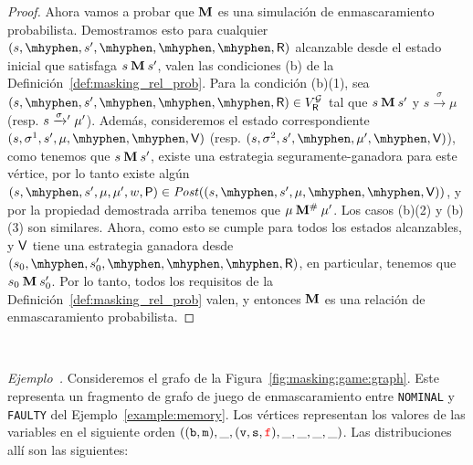 \begin{proof}
Ahora vamos a probar que $\mathbin{\mathbf{M}}$ es una simulación de enmascaramiento probabilista. Demostramos esto para cualquier $(s,\mhyphen,s',\mhyphen, \mhyphen,  \mhyphen, \Refuter)$ alcanzable desde el estado inicial que satisfaga $s \mathbin{\mathbf{M}} s'$, valen las condiciones (b) de la Definición~\ref{def:masking_rel_prob}.  Para la condición (b)(1), sea $(s,\mhyphen,s',\mhyphen, \mhyphen,  \mhyphen, \Refuter) \in V^{\StochG}_\Refuter$ tal que 
$s \mathbin{\mathbf{M}} s'$ y $s \xrightarrow{\sigma} \mu$ (resp. $s \mathrel{{\xrightarrow[]{\sigma}}{}'} \mu'$). Además, consideremos el estado correspondiente 
$(s,\sigma^1,s', \mu, \mhyphen, \mhyphen, \Verifier)$ (resp.  $(s,\sigma^2,s',  \mhyphen, \mu', \mhyphen, \Verifier)$),  como tenemos que $s \mathbin{\mathbf{M}} s'$, existe una estrategia seguramente-ganadora para este vértice, por lo tanto existe algún 
$(s,\mhyphen,s', \mu,  \mu', w,\Probabilistic) \in \post((s,\mhyphen,s', \mu, \mhyphen, \mhyphen, \Verifier))$, y por la propiedad demostrada arriba tenemos que 
$\mu \mathbin{\mathbf{M^{\#}}} \mu'$. Los casos (b)(2) y (b)(3) son similares.  Ahora, como esto se cumple para todos los estados alcanzables, y 
$\mathsf{V}$ tiene una estrategia ganadora desde $(s_0, \mhyphen, s'_0, \mhyphen, \mhyphen,  \mhyphen, \Refuter)$, en particular, tenemos que $s_0 \mathbin{\mathbf{M}} s'_0$. 
Por lo tanto, todos los requisitos de la Definición~\ref{def:masking_rel_prob} valen, y entonces $\mathbin{\mathbf{M}}$ es una relación de enmascaramiento probabilista. 
\end{proof} \\
\fi 

\medskip\par\noindent\textit{Ejemplo~\theexample.}
%
  Consideremos el grafo de la Figura~\ref{fig:masking:game:graph}. 
  Este representa un fragmento de grafo de juego de enmascaramiento entre
  \texttt{NOMINAL} y \texttt{FAULTY} del  Ejemplo~\ref{example:memory}.
  Los vértices representan los valores de las variables en el siguiente orden
  $((\texttt{b},\texttt{m}),\_,(\texttt{v},\texttt{s},\textcolor{red}{\texttt{f}}),\_,\_,\_,\_)$.
  Las distribuciones allí son las siguientes:\vspace{-2ex}%
  
